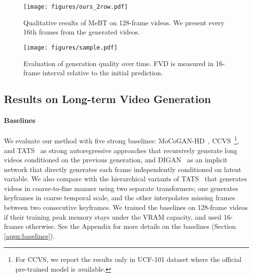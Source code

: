 \documentclass[10pt,twocolumn,letterpaper]{article}
\begin{document}
\iffalse
Our model shows comparable performance with state-of-the-art models. Specifically, our model showed preferable performance on SkyTimelapse dataset which mainly contains global motions. We conjecture that our model has strength in modeling global actions as it can access long-range contexts bidirectionally.

In addition, compared to the autoregressive transformer, our model exhibits improved efficiency in both training and inference. Compared to TATS-base, our model could reduce the training peak memory into . Since our model has the same number of attention layers as the TATS-base, we may conclude that MeBT's efficiency directly comes from the latent bottleneck. Moreover, our model showed about 8 times faster inference speed by reducing the number of decoding steps compared to the autoregressive transformer.
\fi


\begin{figure}[ht]
    \centering
\texttt{[image: figures/ours\_2row.pdf]}
\vspace{-0.17cm}
    \caption{
Qualitative results of MeBT on 128-frame videos. We present every 16th frames from the generated videos.
    }
\label{fig:longterm_ours}
    \vspace{-0.7cm}
\end{figure}

\begin{figure*}[ht]
    \centering
    \texttt{[image: figures/sample.pdf]}
\vspace{-0.3cm}
    \caption{Evaluation of generation quality over time. FVD is measured in 16-frame interval relative to the initial prediction.}
\label{fig:error_propagation}
    \vspace{-0.5cm}
\end{figure*}

\subsection{Results on Long-term Video Generation}
\label{sec:exp_long_video}
\paragraph{Baselines}
We evaluate our method with five strong baselines: MoCoGAN-HD~\cite{MoCoGAN-HD}, CCVS~\cite{CCVS}\footnote{For CCVS, we report the results only in UCF-101 dataset where the official pre-trained model is available.}, and TATS~\cite{TATS} as strong autoregressive approaches that recursively generate long videos conditioned on the previous generation, and DIGAN~\cite{DIGAN} as an implicit network that directly generates each frame independently conditioned on latent variable. 
We also compare with the hierarchical variants of TATS~\cite{TATS} that generates videos in coarse-to-fine manner using two separate transformers; one generates keyframes in coarse temporal scale, and the other interpolates missing frames between two consecutive keyframes.
We trained the baselines on 128-frame videos if their training peak memory stays under the VRAM capacity, and used 16-frames otherwise.
See the Appendix for more details on the baselines (Section \ref{appx:baselines}).
\end{document}
